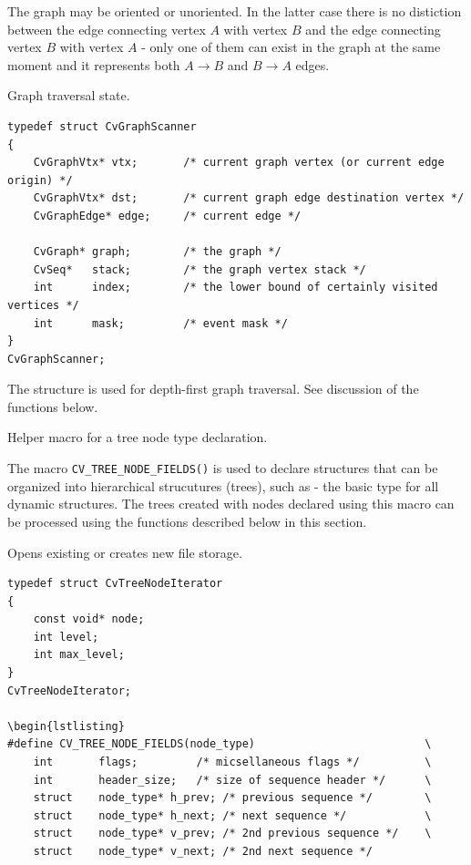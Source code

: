 The graph may be oriented or unoriented. In the latter case there is no
distiction between the edge connecting vertex $A$ with vertex $B$ and the edge
connecting vertex $B$ with vertex $A$ - only one of them can exist in the
graph at the same moment and it represents both $A \rightarrow B$ and
$B \rightarrow A$ edges.

\label{CvGraphScanner}
Graph traversal state.

\begin{lstlisting}
typedef struct CvGraphScanner
{
    CvGraphVtx* vtx;       /* current graph vertex (or current edge origin) */
    CvGraphVtx* dst;       /* current graph edge destination vertex */
    CvGraphEdge* edge;     /* current edge */

    CvGraph* graph;        /* the graph */
    CvSeq*   stack;        /* the graph vertex stack */
    int      index;        /* the lower bound of certainly visited vertices */
    int      mask;         /* event mask */
}
CvGraphScanner;

\end{lstlisting}

The structure  is used for depth-first graph traversal. See discussion of the functions below.

\label{CV_TREE_NODE_FIELDS}
Helper macro for a tree node type declaration.

The macro \texttt{CV\_TREE\_NODE\_FIELDS()} is used to declare structures
that can be organized into hierarchical strucutures (trees), such as
 - the basic type for all dynamic structures. The trees
created with nodes declared using this macro can be processed using the
functions described below in this section.

\label{CvTreeNodeIterator}
Opens existing or creates new file storage.

\begin{lstlisting}
typedef struct CvTreeNodeIterator
{
    const void* node;
    int level;
    int max_level;
}
CvTreeNodeIterator;

\begin{lstlisting}
#define CV_TREE_NODE_FIELDS(node_type)                          \
    int       flags;         /* micsellaneous flags */          \
    int       header_size;   /* size of sequence header */      \
    struct    node_type* h_prev; /* previous sequence */        \
    struct    node_type* h_next; /* next sequence */            \
    struct    node_type* v_prev; /* 2nd previous sequence */    \
    struct    node_type* v_next; /* 2nd next sequence */

\end{lstlisting}

